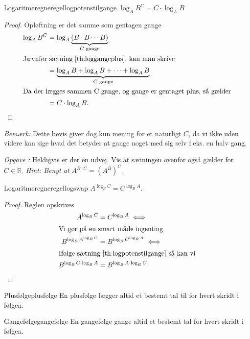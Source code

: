 \documentclass{article}
\newcounter{opgavecnt}
\newcommand{\opg}[1]{\stepcounter{opgavecnt}\textit{Opgave \arabic{opgavecnt}: }#1}
\begin{document}
\begin{theorem}{Logaritmeregneregel}{logpotenstilgange}
    $\log_AB^C = C \cdot \log_AB$
\end{theorem}

\begin{proof}
Opløftning er det samme som gentagen gange
\begin{align*}
    \log_AB^C &= \log_A{\underbrace{(B \cdot B \cdots B)}_{C\text{ gange}}}\\
\intertext{Jævnfør sætning \ref{th:loggangeplus}, kan man skrive}
              &= \underbrace{\log_A{B} + \log_A{B} + \cdots + \log_A{B}}_{C\text{ gange}}\\
\intertext{Da der lægges sammen C gange, og gange er gentaget plus, så gælder}
              &= C \cdot \log_AB.\qedhere
\end{align*}
\end{proof}

\textit{Bemærk:} Dette bevis giver dog kun mening for et naturligt $C$, da vi ikke uden videre kan sige hvad det betyder at gange noget med sig selv f.eks. en halv gang.

\opg{Heldigvis er der en udvej. Vis at sætningen ovenfor også gælder for $C \in \mathbb{R}$. \emph{Hint: Benyt at $A^{B \cdot C} = (A^B)^C$}.}

\begin{theorem}{Logaritmeregneregel}{logswap}
    $A^{\log_BC} = C^{\log_BA}$.
\end{theorem}

\begin{proof}
Reglen opskrives
\begin{align*}
    A^{\log_BC} &= C^{\log_BA} \iff\\
\intertext{Vi gør på en smart måde ingenting}
    B^{\log_B{A^{\log_BC}}} &= B^{\log_B{C^{\log_BA}}} \iff\\
\intertext{Ifølge sætning \ref{th:logpotenstilgange} så kan vi}
    B^{\log_BC \cdot \log_B{A}} &= B^{\log_BA \cdot \log_B{C}}\qedhere
\end{align*}
\end{proof}

\begin{definition}{Plusfølge}{plusfølge}
    En plusfølge lægger altid et bestemt tal til for hvert skridt i følgen.
\end{definition}

\begin{definition}{Gangefølge}{gangefølge}
    En gangefølge gange altid et bestemt tal for hvert skridt i følgen.
\end{definition}
\end{document}
